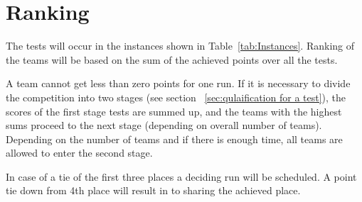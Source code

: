 \section{Ranking}
The tests will occur in the instances shown in Table~\ref{tab:Instances}. Ranking of the teams will be based on the sum of the achieved points over all the tests.

A team cannot get less than zero points for one run. If it is necessary to divide the competition into two stages (see section ~\ref{sec:qulaification for a test}), the scores of the first stage tests are summed up, and the teams with the highest sums proceed to the next stage (depending on overall number of teams). Depending on the number of teams and if there is enough time, all teams are allowed to enter the second stage.

In case of a tie of the first three places a deciding run will be scheduled. A point tie down from 4th place will result in to sharing the achieved place. 

%
%
%


